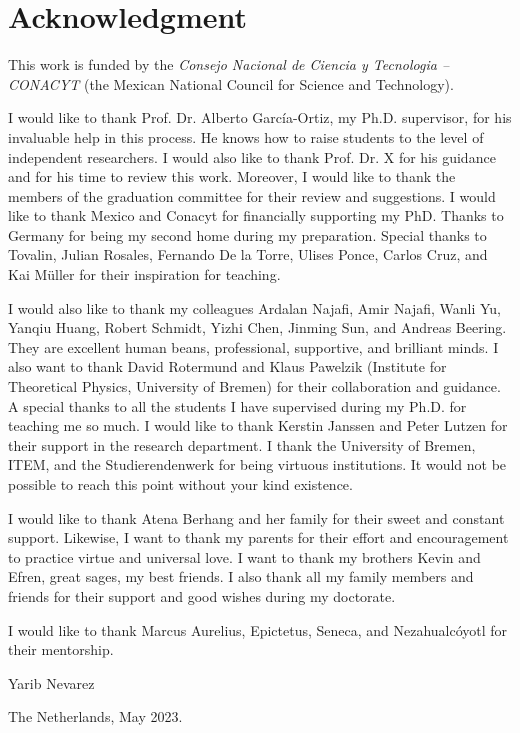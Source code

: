 \chapter*{Acknowledgment}
\thispagestyle{empty}
This work is funded by the \textit{Consejo Nacional de Ciencia y Tecnologia -- CONACYT} (the Mexican National Council for Science and Technology).

I would like to thank Prof. Dr. Alberto Garc\'ia-Ortiz, my Ph.D. supervisor, for his invaluable help in this process. He knows how to raise students to the level of independent researchers. I would also like to thank Prof. Dr. X for his guidance and for his time to review this work. Moreover, I would like to thank the members of the graduation committee for their review and suggestions. I would like to thank Mexico and Conacyt for financially supporting my PhD. Thanks to Germany for being my second home during my preparation. Special thanks to Tovalin, Julian Rosales, Fernando De la Torre, Ulises Ponce, Carlos Cruz, and Kai M\"uller for their inspiration for teaching.

I would also like to thank my colleagues Ardalan Najafi, Amir Najafi, Wanli Yu, Yanqiu Huang, Robert Schmidt, Yizhi Chen, Jinming Sun, and Andreas Beering. They are excellent human beans, professional, supportive, and brilliant minds. I also want to thank David Rotermund and Klaus Pawelzik (Institute for Theoretical Physics, University of Bremen) for their collaboration and guidance. A special thanks to all the students I have supervised during my Ph.D. for teaching me so much. I would like to thank Kerstin Janssen and Peter Lutzen for their support in the research department. I thank the University of Bremen, ITEM, and the Studierendenwerk for being virtuous institutions. It would not be possible to reach this point without your kind existence.


I would like to thank Atena Berhang and her family for their sweet and constant support. Likewise, I want to thank my parents for their effort and encouragement to practice virtue and universal love. I want to thank my brothers Kevin and Efren, great sages, my best friends. I also thank all my family members and friends for their support and good wishes during my doctorate.

I would like to thank Marcus Aurelius, Epictetus, Seneca, and Nezahualc\'oyotl for their mentorship.


Yarib Nevarez

The Netherlands, May 2023.




